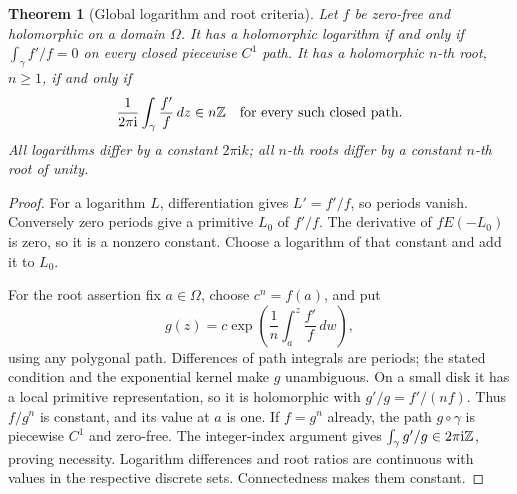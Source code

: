 \documentclass[11pt,a4paper,openany]{book}
\newtheorem{theorem}{Theorem}[chapter]
\theoremstyle{definition}
\theoremstyle{remark}\newtheorem{remark}[theorem]{Remark}
\newcommand{\dd}{\,d}\newcommand{\iu}{\mathrm i}
\newcommand{\family}[1]{}
\begin{document}
\begin{theorem}[Global logarithm and root criteria]\family{D12.04.07}\label{d12:04-07}
Let \(f\) be zero-free and holomorphic on a domain \(\Omega\).
It has a holomorphic logarithm if and only if
\(\int_\gamma f'/f=0\) on every closed piecewise \(C^1\) path.
It has a holomorphic \(n\)-th root, \(n\ge1\), if and only if
\[
 \frac1{2\pi\iu}\int_\gamma\frac{f'}f\dd z\in n\Z
 \quad\hbox{for every such closed path}.
\]
All logarithms differ by a constant \(2\pi\iu k\); all \(n\)-th roots
differ by a constant \(n\)-th root of unity.
\end{theorem}
\begin{proof}
For a logarithm \(L\), differentiation gives \(L'=f'/f\), so periods
vanish. Conversely zero periods give a primitive \(L_0\) of \(f'/f\).
The derivative of \(fE(-L_0)\) is zero, so it is a nonzero constant.
Choose a logarithm of that constant and add it to \(L_0\).

For the root assertion fix \(a\in\Omega\), choose \(c^n=f(a)\), and put
\[
 g(z)=c\exp\left(\frac1n\int_{a}^{z}\frac{f'}f\dd w\right),
\]
using any polygonal path. Differences of path integrals are periods;
the stated condition and the exponential kernel make \(g\) unambiguous.
On a small disk it has a local primitive representation, so it is
holomorphic with \(g'/g=f'/(nf)\). Thus \(f/g^n\) is constant, and its
value at \(a\) is one. If \(f=g^n\) already, the path \(g\circ\gamma\)
is piecewise \(C^1\) and zero-free. The integer-index argument gives
\(\int_\gamma g'/g\in2\pi\iu\Z\), proving necessity.
Logarithm differences and root ratios are continuous with values in
the respective discrete sets. Connectedness makes them constant.
\end{proof}
\end{document}
